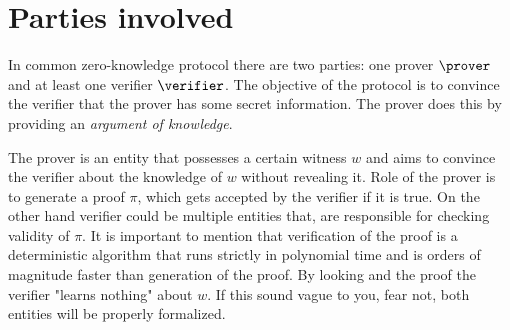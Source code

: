 \section{Parties involved}
In common zero-knowledge protocol there are two parties: one prover $\prover$ and at least one verifier $\verifier$. The objective of the protocol is to convince the verifier that the prover has some secret information. The prover does this by providing an \textit{argument of knowledge}. 


The prover is an entity that possesses a certain witness $w$ and aims to convince the verifier about the knowledge of $w$ without revealing it. Role of the prover is to generate a proof $\pi$, which gets accepted by the verifier if it is true. On the other hand verifier could be multiple entities that, are responsible for checking validity of $\pi$. It is important to mention that verification of the proof is a deterministic algorithm that runs strictly in polynomial time and is orders of magnitude faster than generation of the proof. By looking and the proof the verifier "learns nothing" about $w$. If this sound vague to you, fear not, both entities will be properly formalized.


